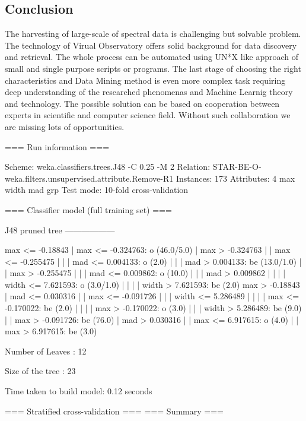 \clearpage


\subsection{Conclusion}

The harvesting of large-scale of spectral data is challenging but
solvable problem. The technology of Virual Observatory offers solid
background for data discovery and retrieval. The whole process can be
automated using UN*X like approach of small and single purpose scripts
or programs. The last stage of choosing the right characteristics and
Data Mining method is even more complex task requiring deep
understanding of the researched phenomenas and Machine Learnig theory
and technology. The possible solution can be based on cooperation
between experts in scientific and computer science field. Without such
collaboration we are missing lots of opportunities.



=== Run information ===

Scheme:       weka.classifiers.trees.J48 -C 0.25 -M 2
Relation:     STAR-BE-O-weka.filters.unsupervised.attribute.Remove-R1
Instances:    173
Attributes:   4
              max
              width
              mad
              grp
Test mode:    10-fold cross-validation

=== Classifier model (full training set) ===

J48 pruned tree
------------------

max <= -0.18843
|   max <= -0.324763: o (46.0/5.0)
|   max > -0.324763
|   |   max <= -0.255475
|   |   |   mad <= 0.004133: o (2.0)
|   |   |   mad > 0.004133: be (13.0/1.0)
|   |   max > -0.255475
|   |   |   mad <= 0.009862: o (10.0)
|   |   |   mad > 0.009862
|   |   |   |   width <= 7.621593: o (3.0/1.0)
|   |   |   |   width > 7.621593: be (2.0)
max > -0.18843
|   mad <= 0.030316
|   |   max <= -0.091726
|   |   |   width <= 5.286489
|   |   |   |   max <= -0.170022: be (2.0)
|   |   |   |   max > -0.170022: o (3.0)
|   |   |   width > 5.286489: be (9.0)
|   |   max > -0.091726: be (76.0)
|   mad > 0.030316
|   |   max <= 6.917615: o (4.0)
|   |   max > 6.917615: be (3.0)

Number of Leaves  : 	12

Size of the tree : 	23


Time taken to build model: 0.12 seconds

=== Stratified cross-validation ===
=== Summary ===

